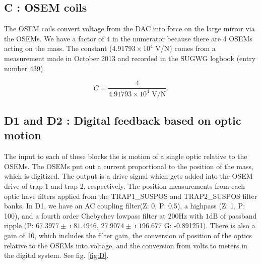%

\subsection{C : OSEM coils}

The OSEM coils convert voltage from the DAC into force on the large mirror via the OSEMs.  We have a factor of 4 in the numerator because there are 4 OSEMs acting on the mass.  The constant ($4.91793\times 10^{4}$ V/N) comes from a measurement made in October 2013 and recorded in the SUGWG logbook (entry number 439).

\begin{equation}
C = \frac{4}{4.91793\times 10^{4}\mbox{ V/N}}.                               
\label{eq:C}
\end{equation}


\subsection{D1 and D2 : Digital feedback based on optic motion}
The input to each of these blocks the is motion of a single optic relative to the OSEMs. The OSEMs put out a current proportional to the position of the mass, which is digitized.  The output is a drive signal which gets added into the OSEM drive of trap 1 and trap 2, respectively.  The position measurements from each optic have filters applied from the TRAP1\_SUSPOS and TRAP2\_SUSPOS filter banks. In D1, we have an AC coupling filter(Z: 0, P: 0.5), a highpass (Z: 1, P: 100), and a fourth order Chebychev lowpass filter at $200\mbox{Hz}$ with $1\mbox{dB}$ of passband ripple (P: $67.3977\pm\imath81.4946$, $27.9074\pm\imath196.677$ G: -0.891251).  There is also a gain of 10, which includes the filter gain, the conversion of position of the optics relative to the OSEMs into voltage, and the conversion from volts to meters in the digital system. See fig. \ref{fig:D}. 

